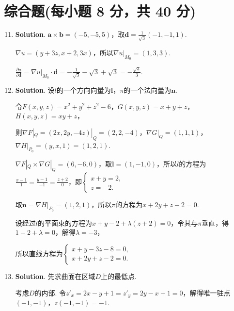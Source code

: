 \documentclass[../Main.tex]{subfiles}
\begin{document}
\section{综合题(每小题 8 分，共 40 分)}
\begin{enumerate}
    \setcounter{enumi}{10}
    \item \textbf{Solution}. $\boldsymbol{a}\times \boldsymbol{b}= (-5,-5,5)$，取$\boldsymbol
              {d}= \frac{1}{\sqrt{3}}(-1,-1,1)$.

          $\nabla u = (y+3z, x+2, 3x)$，所以$\nabla u|_{M_0}= (1,3,3)$.

          $\frac{\partial u}{\partial \boldsymbol{d}}= \nabla u|_{M_0}\cdot \boldsymbol
              {d}= -\frac{1}{\sqrt{3}}-\sqrt{3}+\sqrt{3}= -\frac{\sqrt{3}}{3}$.

    \item \textbf{Solution}. 设$l$的一个方向向量为$\boldsymbol{l}$，$\pi$的一个法向量为$\boldsymbol
              {n}$.

          令$F(x,y,z)= x^{2}+y^{2}+z^{2}-6$，$G(x,y,z)=x+y+z$，$H(x,y,z)=xy+z$，

          则$\nabla F|_{Q}=(2x,2y,-4z)|_{Q}=(2,2,-4)$，$\nabla G|_{Q}=(1,1,1)$，$\nabla
              H|_{P_0}=(y,x,1)=(1,2,1)$.

          $\nabla F|_{Q}\times \nabla G|_{Q}=(6,-6,0)$，取$\boldsymbol{l}=(1,-1,0)$，所以$l$的方程为$\frac{x-1}{1}
              =\frac{y-1}{-1}=\frac{z+2}{0}$，即$\begin{cases}
                  x+y = 2, \\
                  z = -2.
              \end{cases}$

          取$\boldsymbol{n}=\nabla H|_{P_0}=(1,2,1)$，所以$\pi$的方程为$x+2y+z-2=0$.

          设经过$l$的平面束的方程为$x+y-2+\lambda(z+2)=0$，令其与$\pi$垂直，得$1+2+\lambda
              =0$，解得$\lambda=-3$，

          所以直线方程为$\begin{cases}
                  x+y-3z-8=0, \\
                  x+2y+z-2=0.
              \end{cases}$

    \item \textbf{Solution}. 先求曲面在区域$D$上的最低点.

          考虑$D$的内部. 令$z'_{x} = 2x-y+1 = z'_{y} = 2y-x+1 = 0$，解得唯一驻点$(-1,
              -1)$，$z(-1,-1)=-1$.


\end{enumerate}
\end{document}
